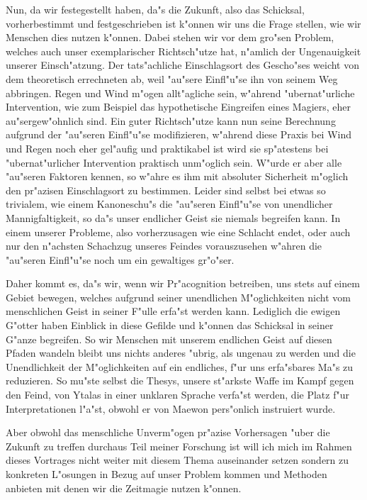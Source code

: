 \documentclass[a5paper,8pt]{book}
\begin{document}
Nun, da wir festegestellt haben, da"s die Zukunft, also das Schicksal, vorherbestimmt und festgeschrieben ist k"onnen wir uns die Frage stellen, wie wir Menschen dies nutzen k"onnen.
Dabei stehen wir vor dem gro"sen Problem, welches auch unser exemplarischer Richtsch"utze hat, n"amlich der Ungenauigkeit unserer Einsch"atzung. Der tats"achliche Einschlagsort des Gescho"ses weicht von dem theoretisch errechneten ab, weil "au"sere Einfl"u"se ihn von seinem Weg abbringen. Regen und Wind m"ogen allt"agliche sein, w"ahrend "ubernat"urliche Intervention, wie zum Beispiel das hypothetische Eingreifen eines Magiers, eher au"sergew"ohnlich sind.
Ein guter Richtsch"utze kann nun seine Berechnung aufgrund der "au"seren Einfl"u"se modifizieren, w"ahrend diese Praxis bei Wind und Regen noch eher gel"aufig und praktikabel ist wird sie sp"atestens bei "ubernat"urlicher Intervention praktisch unm"oglich sein. W"urde er aber alle "au"seren Faktoren kennen, so w"ahre es ihm mit absoluter Sicherheit m"oglich den pr"azisen Einschlagsort zu bestimmen. Leider sind selbst bei etwas so trivialem, wie einem Kanoneschu"s die "au"seren Einfl"u"se von unendlicher Mannigfaltigkeit, so da"s unser endlicher Geist sie niemals begreifen kann.
In einem unserer Probleme, also vorherzusagen wie eine Schlacht endet, oder auch nur den n"achsten Schachzug unseres Feindes vorauszusehen w"ahren die "au"seren Einfl"u"se noch um ein gewaltiges gr"o"ser.

Daher kommt es, da"s wir, wenn wir Pr"acognition betreiben, uns stets auf einem Gebiet bewegen, welches aufgrund seiner unendlichen M"oglichkeiten nicht vom menschlichen Geist in seiner F"ulle erfa"st werden kann. Lediglich die ewigen G"otter haben Einblick in diese Gefilde und k"onnen das Schicksal in seiner G"anze begreifen.
So wir Menschen mit unserem endlichen Geist auf diesen Pfaden wandeln bleibt uns nichts anderes "ubrig, als ungenau zu werden und die Unendlichkeit der M"oglichkeiten auf ein endliches, f"ur uns erfa"sbares Ma"s zu reduzieren.
So mu"ste selbst die Thesys, unsere st"arkste Waffe im Kampf gegen den Feind, von Ytalas in einer unklaren Sprache verfa"st werden, die Platz f"ur Interpretationen l"a"st, obwohl er von Maewon pers"onlich instruiert wurde. 

Aber obwohl das menschliche Unverm"ogen pr"azise Vorhersagen "uber die Zukunft zu treffen durchaus Teil meiner Forschung ist will ich mich im Rahmen dieses Vortrages nicht weiter mit diesem Thema auseinander setzen sondern zu konkreten L"osungen in Bezug auf unser Problem kommen und Methoden anbieten mit denen wir die Zeitmagie nutzen k"onnen.
\end{document}
